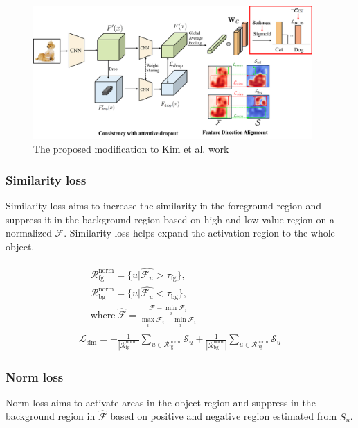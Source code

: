 \documentclass[conference]{IEEEtran}
\begin{document}
\begin{figure}
    \centering
    \includegraphics[width=0.95\textwidth]{Figures/architecture.png}
    \caption{The proposed modification to Kim et al. \cite{kim2022bridging} work}
    \label{fig:architecture}
\end{figure}

\subsubsection{Similarity loss}
Similarity loss aims to increase the similarity in the foreground region and suppress it in the background region based on high and low value region on a normalized $\mathcal{F}$. Similarity loss helps expand the activation region to the whole object.

\begin{gather} \label{eq:sim loss}
    \begin{aligned}
         & \mathcal{R}_{\text{fg}}^{\text{norm}} = \{u|\hat{\mathcal{F}_u} > \tau_{\text{fg}}\},                                        & \\
         & \mathcal{R}_{\text{bg}}^{\text{norm}} = \{u|\hat{\mathcal{F}_u} < \tau_{\text{bg}}\},                                        & \\
         & \text{where} ~ \hat{\mathcal{F}} = \frac{\mathcal{F} - \min_i{\mathcal{F}_i}}{\max_i{\mathcal{F}_i} - \min_i{\mathcal{F}_i}} &
    \end{aligned}\\
    \mathcal{L}_{\text{sim}} = -\frac{1}{|\mathcal{R}_{\text{fg}}^{\text{norm}}|} \sum_{u\in\mathcal{R}_{\text{fg}}^{\text{norm}}}{\mathcal{S}_u} + \frac{1}{|\mathcal{R}_{\text{bg}}^{\text{norm}}|} \sum_{u\in\mathcal{R}_{\text{bg}}^{\text{norm}}}{\mathcal{S}_u}
\end{gather}

\subsubsection{Norm loss}
Norm loss aims to activate areas in the object region and suppress in the background region in $\hat{\mathcal{F}}$ based on positive and negative region estimated from $S_u$.
\end{document}
